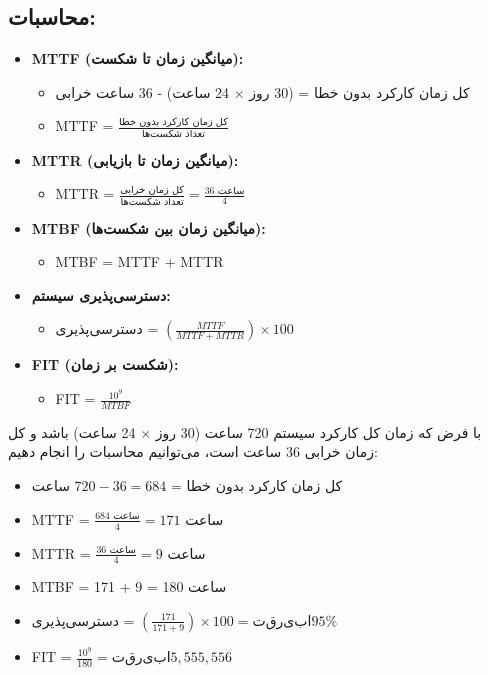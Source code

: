\subsection*{محاسبات:}
\begin{itemize}
	\item \textbf{MTTF (میانگین زمان تا شکست):}
	\begin{itemize}
		\item کل زمان کارکرد بدون خطا = (30 روز $\times$ 24 ساعت) - 36 ساعت خرابی
		\item MTTF = $\frac{\text{کل زمان کارکرد بدون خطا}}{\text{تعداد شکست‌ها}}$
	\end{itemize}
	
	\item \textbf{MTTR (میانگین زمان تا بازیابی):}
	\begin{itemize}
		\item MTTR = $\frac{\text{کل زمان خرابی}}{\text{تعداد شکست‌ها}} = \frac{36 \text{ ساعت}}{4}$
	\end{itemize}
	
	\item \textbf{MTBF (میانگین زمان بین شکست‌ها):}
	\begin{itemize}
		\item MTBF = MTTF + MTTR
	\end{itemize}
	
	\item \textbf{دسترسی‌پذیری سیستم:}
	\begin{itemize}
		\item دسترسی‌پذیری = $\left( \frac{MTTF}{MTTF + MTTR} \right) \times 100$
	\end{itemize}
	
	\item \textbf{FIT (شکست بر زمان):}
	\begin{itemize}
		\item FIT = $\frac{10^9}{MTBF}$
	\end{itemize}
\end{itemize}

با فرض که زمان کل کارکرد سیستم 720 ساعت (30 روز $\times$ 24 ساعت) باشد و کل زمان خرابی 36 ساعت است، می‌توانیم محاسبات را انجام دهیم:

\begin{itemize}
	\item کل زمان کارکرد بدون خطا = $720 - 36 = 684$ ساعت
	\item MTTF = $\frac{684 \text{ ساعت}}{4} = 171 \text{ ساعت}$
	\item MTTR = $\frac{36 \text{ ساعت}}{4} = 9 \text{ ساعت}$
	\item MTBF = 171 + 9 = 180 ساعت
	\item دسترسی‌پذیری = $\left( \frac{171}{171 + 9} \right) \times 100 = تقریبا 95\%$
	\item FIT = $\frac{10^9}{180} = تقریبا 5,555,556$
\end{itemize}

